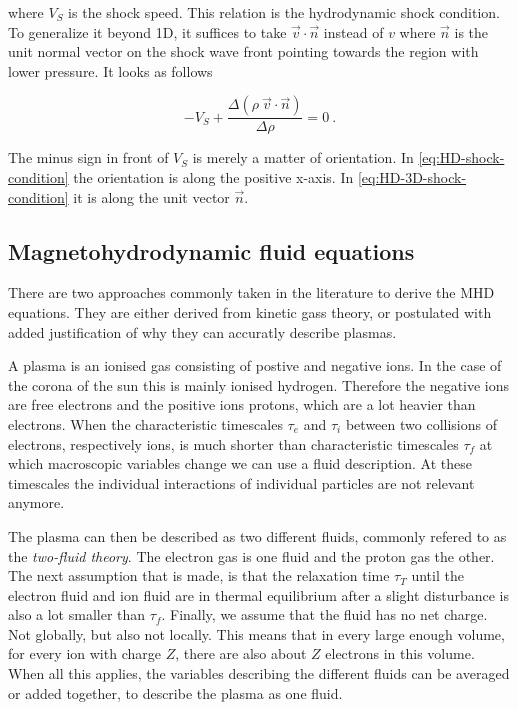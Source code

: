 where $V_S$ is the shock speed. This relation is the hydrodynamic shock condition. To generalize it beyond 1D, it suffices to take $\vec{v} \cdot \vec{n}$ instead of $v$ where $\vec{n}$ is the unit normal vector on the shock wave front pointing towards the region with lower pressure. It looks as follows

\begin{equation}
\label{eq:HD-3D-shock-condition}
- V_S + \frac{\Delta(\rho \ \vec{v} \cdot \vec{n})}{\Delta \rho} = 0 \ .
\end{equation}

The minus sign in front of $V_S$ is merely a matter of orientation. In \autoref{eq:HD-shock-condition} the orientation is along the positive x-axis. In \autoref{eq:HD-3D-shock-condition} it is along the unit vector $\vec{n}$.

\subsection{Magnetohydrodynamic fluid equations}
There are two approaches commonly taken in the literature to derive the MHD equations. They are either derived from kinetic gass theory, or postulated with added justification of why they can accuratly describe plasmas.

A plasma is an ionised gas consisting of postive and negative ions. In the case of the corona of the sun this is mainly ionised hydrogen.
Therefore the negative ions are free electrons and the positive ions protons, which are a lot heavier than electrons.
When the characteristic timescales $\tau_e$ and $\tau_i$ between two collisions of electrons, respectively ions, is much shorter than characteristic timescales $\tau_f$ at which macroscopic variables change we can use a fluid description. 
At these timescales the individual interactions of individual particles are not relevant anymore.

The plasma can then be described as two different fluids, commonly refered to as the \emph{two-fluid theory}.
The electron gas is one fluid and the proton gas the other. 
The next assumption that is made, is that the relaxation time $\tau_T$ until the electron fluid and ion fluid are in thermal equilibrium after a slight disturbance is also a lot smaller than $\tau_f$.
Finally, we assume that the fluid has no net charge. Not globally, but also not locally. 
This means that in every large enough volume, for every ion with charge $Z$, there are also about $Z$ electrons in this volume.
When all this applies, the variables describing the different fluids can be averaged or added together, to describe the plasma as one fluid.

